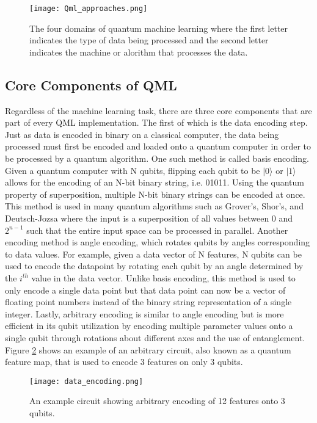 \documentclass[
	a4paper, %
	10pt, %
	unnumberedsections, %
	twoside, %
]{LTJournalArticle}
\newcommand{\ket}[1]{\lvert#1\rangle} %
\begin{document}
\begin{figure} %
	\texttt{[image: Qml\_approaches.png]}
	\caption{The four domains of quantum machine learning where the first letter indicates the type of data being processed and the second letter indicates the machine or alorithm that processes the data.}
	\label{fig:qmldomains}
\end{figure}

\subsection{Core Components of QML}
Regardless of the machine learning task, there are three core components that are part of every QML implementation. The first of which is the data encoding step. Just as data is encoded in 
binary on a classical computer, the data being processed must first be encoded and loaded onto a quantum computer in order to be processed by a quantum algorithm. One such method is called 
basis encoding. Given a quantum computer with N qubits, flipping each qubit to be $\ket{0}$ or $\ket{1}$ allows for the encoding of an N-bit binary string, i.e. 01011. Using the quantum 
property of superposition, multiple N-bit binary strings can be encoded at once. This method is used in many quantum algorithms such as Grover's, Shor's, and Deutsch-Jozsa where the input is 
a superposition of all values between 0 and $2^{n-1}$ such that the entire input space can be processed in parallel. Another encoding method is angle encoding, which rotates qubits by angles 
corresponding to data values. For example, given a data vector of N features, N qubits can be used to encode the datapoint by rotating each qubit by an angle determined by the $i^{th}$ value 
in the data vector. Unlike basis encoding, this method is used to only encode a single data point but that data point can now be a vector of floating point numbers instead of the binary string 
representation of a single integer. Lastly, arbitrary encoding is similar to angle encoding but is more efficient in its qubit utilization by encoding multiple parameter values onto a single 
qubit through rotations about different axes and the use of entanglement. Figure \ref{fig:dataencoding} shows an example of an arbitrary circuit, also known as a quantum feature map, that is 
used to encode 3 features on only 3 qubits.

\begin{figure} %
	\texttt{[image: data\_encoding.png]}
	\caption{An example circuit showing arbitrary encoding of 12 features onto 3 qubits.}
	\label{fig:dataencoding}
\end{figure}
\end{document}
